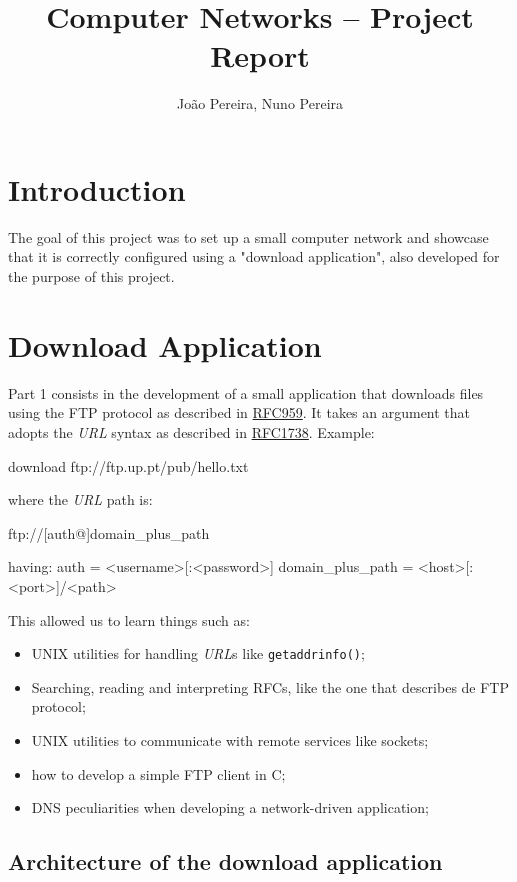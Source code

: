 \documentclass[11pt,a4paper,twocolumn]{article}
\title{Computer Networks -- \nth{2} Project Report}
\author{João Pereira, Nuno Pereira}
\begin{document}
\maketitle

\section{Introduction}

The goal of this project was to set up a small computer network and showcase that it is correctly configured using a "download application", also developed for the purpose of this project.

\section{Download Application}

Part 1 consists in the development of a small application that downloads files using the FTP protocol as described in \href{https://www.rfc-editor.org/rfc/rfc959}{RFC959}.
It takes an argument that adopts the \textit{URL} syntax as described in \href{https://www.rfc-editor.org/rfc/rfc1738}{RFC1738}. Example:

\begin{code-bash}
download ftp://ftp.up.pt/pub/hello.txt
\end{code-bash}

where the \textit{URL} path is:

\begin{code-bash}
ftp://[auth@]domain_plus_path

having:
auth = <username>[:<password>]
domain_plus_path = <host>[:<port>]/<path>
\end{code-bash}

This allowed us to learn things such as:
\begin{itemize}
    \item UNIX utilities for handling \textit{URL}s like \lstinline{getaddrinfo()};
    \item Searching, reading and interpreting RFCs, like the one that describes de FTP protocol;
    \item UNIX utilities to communicate with remote services like sockets;
    \item how to develop a simple FTP client in C;
    \item DNS peculiarities when developing a network-driven application;
\end{itemize}

\subsection{Architecture of the download application}
\end{document}
